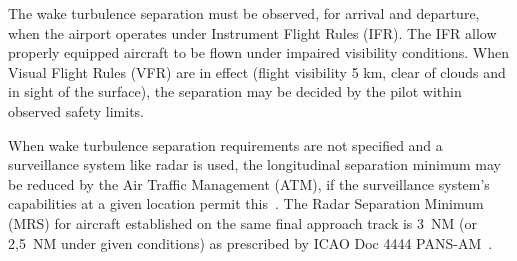 \begin{table}[h]
\centering
{}
\caption[ICAO wake turbulence categories and separation minima]{ICAO wake turbulence categories and separation minima to avoid wake vortex encounter.(*) indicate Radar Separation Minimum (MRS)~\cite{noauthor_recat_2018, rooseleer2015recat}.} \label{tab:ICAO_WTC}
\end{table}

The wake turbulence separation must be observed, for arrival and departure, when the airport operates under Instrument Flight Rules (IFR). The IFR allow properly equipped aircraft to be flown under impaired visibility conditions. When Visual Flight Rules (VFR) are in effect (flight visibility 5 km, clear of clouds and in sight of the surface), the separation may be decided by the pilot within observed safety limits.~\cite{gerz_commercial_2002, icao_annex_2005} 

When wake turbulence separation requirements are not specified and a surveillance system like radar is used, the longitudinal separation minimum may be reduced by the Air Traffic Management (ATM), if the surveillance system's capabilities at a given location permit this~\cite{MRS_separation_standard}. The Radar Separation Minimum (MRS) for aircraft established on the same final approach track is 3~NM (or 2,5~NM under given conditions) as prescribed by ICAO Doc 4444 PANS-AM~\cite{doc44444}.

